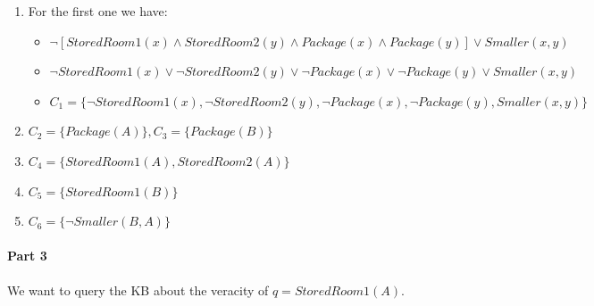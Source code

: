 \documentclass[10pt,a4paper]{article}
\newcommand{\braces}[1]{%
  \lbrace{#1}\rbrace}
\begin{document}
\begin{enumerate}
\item For the first one we have:

	\begin{itemize}
	\item $\neg[StoredRoom1(x) \wedge StoredRoom2(y) \wedge Package(x) \wedge Package(y)] \vee Smaller(x,y)$
	\item $\neg StoredRoom1(x) \vee \neg StoredRoom2(y) \vee \neg Package(x) \vee \neg Package(y) \vee Smaller(x,y)$
	\item $C_1=\braces{\neg StoredRoom1(x) , \neg StoredRoom2(y) , \neg Package(x) , \neg Package(y) , Smaller(x,y)}$
	\end{itemize}
\item $C_2=\braces{Package(A)},C_3=\braces{Package(B)}$
\item $C_4=\braces{StoredRoom1(A), StoredRoom2(A)}$
\item $C_5=\braces{StoredRoom1(B)}$
\item $C_6=\braces{\neg Smaller(B,A)}$
\end{enumerate}

\paragraph{Part 3}
We want to query the KB  about the veracity of $q=StoredRoom1(A)$.
\end{document}
